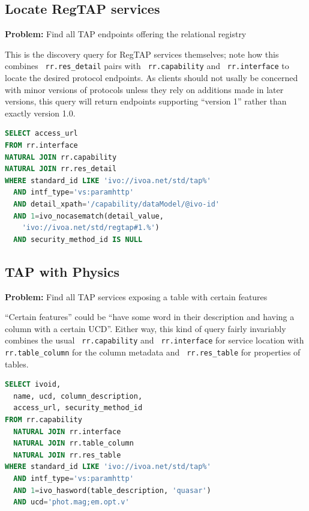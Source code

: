 \documentclass[11pt,a4paper]{ivoa}
\newcommand{\rtent}[1]{\texttt{\color{rtcolor} #1}}
\begin{document}
\subsection{Locate RegTAP services}

\textbf{Problem:} Find all TAP endpoints offering the relational
registry

This is the discovery query for RegTAP services themselves;  note how
this combines 
\rtent{rr.res\_detail} pairs with
\rtent{rr.capability}
and 
\rtent{rr.interface} to locate the desired protocol
endpoints.  As clients should not usally be concerned with minor
versions of protocols unless  they rely on additions made in later
versions, this query will return endpoints supporting ``version 1'' rather
than exactly version 1.0.


\begin{lstlisting}[language=SQL,flexiblecolumns=true]
SELECT access_url
FROM rr.interface
NATURAL JOIN rr.capability
NATURAL JOIN rr.res_detail
WHERE standard_id LIKE 'ivo://ivoa.net/std/tap%'
  AND intf_type='vs:paramhttp'
  AND detail_xpath='/capability/dataModel/@ivo-id'
  AND 1=ivo_nocasematch(detail_value, 
    'ivo://ivoa.net/std/regtap#1.%')
  AND security_method_id IS NULL
\end{lstlisting}

\subsection{TAP with Physics}

\textbf{Problem:} Find all TAP services
exposing a table with certain features

``Certain features'' could be ``have some word in their description
and having a column with a certain UCD''.  Either way, this kind of query
fairly invariably combines the usual 
\rtent{rr.capability} and 
\rtent{rr.interface}
 for service location with
\rtent{rr.table\_column}
 for the column metadata
and 
\rtent{rr.res\_table} for properties of tables.


\begin{lstlisting}[language=SQL,flexiblecolumns=true]
SELECT ivoid, 
  name, ucd, column_description,
  access_url, security_method_id
FROM rr.capability 
  NATURAL JOIN rr.interface
  NATURAL JOIN rr.table_column
  NATURAL JOIN rr.res_table
WHERE standard_id LIKE 'ivo://ivoa.net/std/tap%'
  AND intf_type='vs:paramhttp'
  AND 1=ivo_hasword(table_description, 'quasar')
  AND ucd='phot.mag;em.opt.v'
\end{lstlisting}
\end{document}
